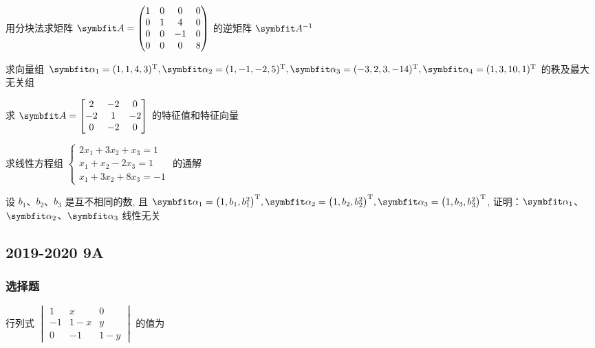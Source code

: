 \begin{ti}
	用分块法求矩阵 $\bA = \begin{pmatrix}
		1 & 0 & 0 & 0 \\
		0 & 1 & 4 & 0 \\
		0 & 0 & -1 & 0 \\
		0 & 0 & 0 & 8
	\end{pmatrix}$ 的逆矩阵 $\bA^{-1}$
\end{ti}

\begin{ti}
	求向量组 $\balpha_{1} = (1,1,4,3)^{\TT},\balpha_{2} = (1,-1,-2,5)^{\TT},\balpha_{3} = (-3,2,3,-14)^{\TT},\balpha_{4} = (1,3,10,1)^{\TT}$ 的秩及最大无关组
\end{ti}

\begin{ti}
	求 $\bA = \begin{bmatrix}
		2 & -2 & 0 \\
		-2 & 1 & -2 \\
		0 & -2 & 0
	\end{bmatrix}$ 的特征值和特征向量
\end{ti}

\begin{ti}
	求线性方程组 $\begin{cases}
		2x_{1} + 3x_{2} + x_{3} = 1 \\
		x_{1} + x_{2} - 2x_{3} = 1 \\
		x_{1} + 3x_{2} + 8x_{3} = -1
	\end{cases}$ 的通解
\end{ti}

\begin{ti}
	设 $b_{1}$、$b_{2}$、$b_{3}$ 是互不相同的数, 且 $\balpha_{1} = \bigl(1,b_{1},b_{1}^{2}\bigr)^{\TT},\balpha_{2} = \bigl(1,b_{2},b_{2}^{2}\bigr)^{\TT},\balpha_{3} = \bigl(1,b_{3},b_{3}^{2}\bigr)^{\TT}$, 证明：$\balpha_{1}$、$\balpha_{2}$、$\balpha_{3}$ 线性无关
\end{ti}

\subsection{2019-2020 9A}
\subsubsection{选择题}
\begin{ti}
	行列式 $\begin{vmatrix} 1 & x & 0 \\ -1 & 1-x & y \\ 0 & -1 & 1-y \end{vmatrix}$ 的值为 \kuo
\end{ti}

